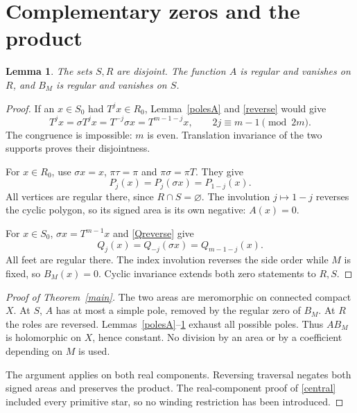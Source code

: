 \documentclass[11pt]{article}
\newtheorem{lemma}{Lemma}
\begin{document}
\section{Complementary zeros and the product}
\begin{lemma}\label{zeros}
The sets \(S,R\) are disjoint. The function \(A\) is regular and
vanishes on \(R\), and \(B_M\) is regular and vanishes on \(S\).
\end{lemma}
\begin{proof}
If an \(x\in S_0\) had \(T^jx\in R_0\), Lemma~\ref{polesA}
and \eqref{reverse} would give
\[
 T^jx=\sigma T^jx=T^{-j}\sigma x=T^{m-1-j}x,
 \qquad 2j\equiv m-1\pmod{2m}.
\]
The congruence is impossible: \(m\) is even. Translation invariance
of the two supports proves their disjointness.

For \(x\in R_0\), use \(\sigma x=x\), \(\pi\tau=\pi\) and
\(\pi\sigma=\pi T\). They give
\[
 P_j(x)=P_j(\sigma x)=P_{1-j}(x).
\]
All vertices are regular there, since \(R\cap S=\varnothing\).
The involution \(j\mapsto1-j\) reverses the cyclic polygon, so its
signed area is its own negative: \(A(x)=0\).

For \(x\in S_0\), \(\sigma x=T^{m-1}x\) and
\eqref{Qreverse} give
\[
 Q_j(x)=Q_{-j}(\sigma x)=Q_{m-1-j}(x).
\]
All feet are regular there. The index involution reverses the side
order while \(M\) is fixed, so \(B_M(x)=0\).
Cyclic invariance extends both zero statements to \(R,S\).
\end{proof}

\begin{proof}[Proof of Theorem~\ref{main}]
The two areas are meromorphic on connected compact \(X\).
At \(S\), \(A\) has at most a simple pole, removed by the regular
zero of \(B_M\). At \(R\) the roles are reversed.
Lemmas~\ref{polesA}--\ref{zeros} exhaust all possible poles.
Thus \(A B_M\) is holomorphic on \(X\), hence constant.
No division by an area or by a coefficient depending on \(M\) is used.

The argument applies on both real components. Reversing traversal
negates both signed areas and preserves the product.
The real-component proof of \eqref{central} included every primitive
star, so no winding restriction has been introduced.
\end{proof}
\end{document}
